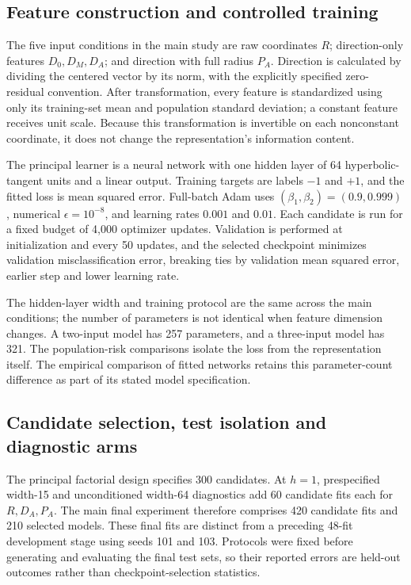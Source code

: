 \documentclass[12pt,a4paper]{article}
\begin{document}
\subsection{Feature construction and controlled training}
The five input conditions in the main study are raw coordinates \(R\); direction-only features \(D_0,D_M,D_A\); and direction with full radius \(P_A\). Direction is calculated by dividing the centered vector by its norm, with the explicitly specified zero-residual convention. After transformation, every feature is standardized using only its training-set mean and population standard deviation; a constant feature receives unit scale. Because this transformation is invertible on each nonconstant coordinate, it does not change the representation's information content.

The principal learner is a neural network with one hidden layer of 64 hyperbolic-tangent units and a linear output. Training targets are labels \(-1\) and \(+1\), and the fitted loss is mean squared error. Full-batch Adam \citep{Kingma2015} uses \((\beta_1,\beta_2)=(0.9,0.999)\), numerical \(\epsilon=10^{-8}\), and learning rates \(0.001\) and \(0.01\). Each candidate is run for a fixed budget of 4,000 optimizer updates. Validation is performed at initialization and every 50 updates, and the selected checkpoint minimizes validation misclassification error, breaking ties by validation mean squared error, earlier step and lower learning rate.

The hidden-layer width and training protocol are the same across the main conditions; the number of parameters is not identical when feature dimension changes. A two-input model has 257 parameters, and a three-input model has 321. The population-risk comparisons isolate the loss from the representation itself. The empirical comparison of fitted networks retains this parameter-count difference as part of its stated model specification.

\subsection{Candidate selection, test isolation and diagnostic arms}
The principal factorial design specifies 300 candidates. At \(h=1\), prespecified width-15 and unconditioned width-64 diagnostics add 60 candidate fits each for \(R,D_A,P_A\). The main final experiment therefore comprises 420 candidate fits and 210 selected models. These final fits are distinct from a preceding 48-fit development stage using seeds 101 and 103. Protocols were fixed before generating and evaluating the final test sets, so their reported errors are held-out outcomes rather than checkpoint-selection statistics.
\end{document}
